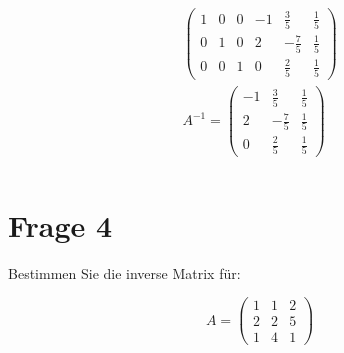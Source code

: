 \begin{align*}
    \begin{pmatrix}
        1 & 0 & 0 & -1 & \frac{3}{5}  & \frac{1}{5} \\
        0 & 1 & 0 & 2  & -\frac{7}{5} & \frac{1}{5} \\
        0 & 0 & 1 & 0  & \frac{2}{5}  & \frac{1}{5}
    \end{pmatrix}  \\
    A^{-1} =     \begin{pmatrix}
                     -1 & \frac{3}{5}  & \frac{1}{5} \\
                     2  & -\frac{7}{5} & \frac{1}{5} \\
                     0  & \frac{2}{5}  & \frac{1}{5}
                 \end{pmatrix} \\
\end{align*}

\section{Frage 4}

Bestimmen Sie die inverse Matrix für:

\[
    A = \begin{pmatrix}
        1 & 1 & 2 \\
        2 & 2 & 5 \\
        1 & 4 & 1
    \end{pmatrix}
\]

